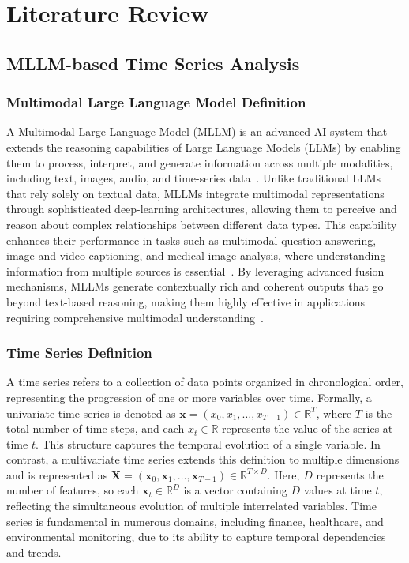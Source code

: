 \section{Literature Review}
\label{appendix1}

\subsection{MLLM-based Time Series Analysis}

\subsubsection{Multimodal Large Language Model Definition}
A Multimodal Large Language Model (MLLM) is an advanced AI system that extends the reasoning capabilities of Large Language Models (LLMs) by enabling them to process, interpret, and generate information across multiple modalities, including text, images, audio, and time-series data~\cite{wu2023multimodal}. Unlike traditional LLMs that rely solely on textual data, MLLMs integrate multimodal representations through sophisticated deep-learning architectures, allowing them to perceive and reason about complex relationships between different data types. This capability enhances their performance in tasks such as multimodal question answering, image and video captioning, and medical image analysis, where understanding information from multiple sources is essential~\cite{yin2023survey}. By leveraging advanced fusion mechanisms, MLLMs generate contextually rich and coherent outputs that go beyond text-based reasoning, making them highly effective in applications requiring comprehensive multimodal understanding~\cite{zhang2024mm}.

\subsubsection{Time Series Definition} 
A time series refers to a collection of data points organized in chronological order, representing the progression of one or more variables over time. Formally, a univariate time series is denoted as $\mathbf{x} = (x_0, x_1, \dots, x_{T-1}) \in \mathbb{R}^{T}$, where $T$ is the total number of time steps, and each $x_t \in \mathbb{R}$ represents the value of the series at time $t$. This structure captures the temporal evolution of a single variable. In contrast, a multivariate time series extends this definition to multiple dimensions and is represented as $\mathbf{X} = (\mathbf{x}_0, \mathbf{x}_1, \dots, \mathbf{x}_{T-1}) \in \mathbb{R}^{T \times D}$. Here, $D$ represents the number of features, so each $\mathbf{x}_t \in \mathbb{R}^D$ is a vector containing $D$ values at time $t$, reflecting the simultaneous evolution of multiple interrelated variables. Time series is fundamental in numerous domains, including finance, healthcare, and environmental monitoring, due to its ability to capture temporal dependencies and trends.

